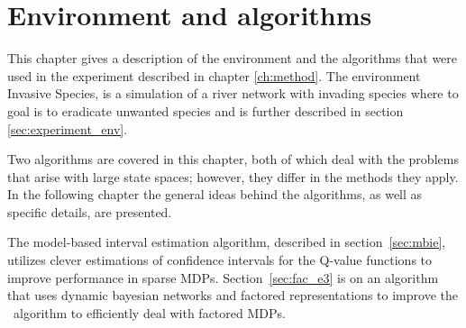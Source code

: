\chapter{Environment and algorithms}
\label{ch:algo}

This chapter gives a description of the environment and the algorithms that
were used in the experiment described in chapter \ref{ch:method}. The environment Invasive Species, is a simulation of a river network with invading species where to goal is to eradicate unwanted species and is further described in section \ref{sec:experiment_env}. 

Two algorithms are covered in this chapter, both of which deal with the
problems that arise with large state spaces; however, they differ in the
methods they apply. In the following chapter the general ideas behind the
algorithms, as well as specific details, are presented. 

The model-based interval estimation algorithm, described in
section~\ref{sec:mbie}, utilizes clever estimations of confidence intervals for
the Q-value functions to improve performance in sparse MDPs.
Section~\ref{sec:fac_e3} is on an algorithm that uses dynamic bayesian networks
and factored representations to improve the \etre\ algorithm to efficiently
deal with factored MDPs. 




